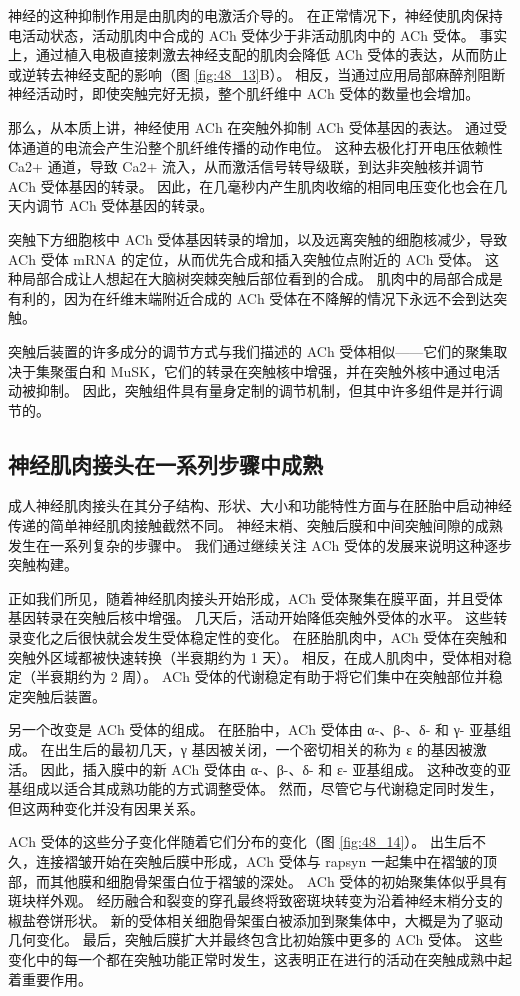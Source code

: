 神经的这种抑制作用是由肌肉的电激活介导的。 在正常情况下，神经使肌肉保持电活动状态，活动肌肉中合成的 ACh 受体少于非活动肌肉中的 ACh 受体。 事实上，通过植入电极直接刺激去神经支配的肌肉会降低 ACh 受体的表达，从而防止或逆转去神经支配的影响（图 \ref{fig:48_13}B）。 相反，当通过应用局部麻醉剂阻断神经活动时，即使突触完好无损，整个肌纤维中 ACh 受体的数量也会增加。

那么，从本质上讲，神经使用 ACh 在突触外抑制 ACh 受体基因的表达。 通过受体通道的电流会产生沿整个肌纤维传播的动作电位。 这种去极化打开电压依赖性 Ca2+ 通道，导致 Ca2+ 流入，从而激活信号转导级联，到达非突触核并调节 ACh 受体基因的转录。 因此，在几毫秒内产生肌肉收缩的相同电压变化也会在几天内调节 ACh 受体基因的转录。

突触下方细胞核中 ACh 受体基因转录的增加，以及远离突触的细胞核减少，导致 ACh 受体 mRNA 的定位，从而优先合成和插入突触位点附近的 ACh 受体。 这种局部合成让人想起在大脑树突棘突触后部位看到的合成。 肌肉中的局部合成是有利的，因为在纤维末端附近合成的 ACh 受体在不降解的情况下永远不会到达突触。

突触后装置的许多成分的调节方式与我们描述的 ACh 受体相似——它们的聚集取决于集聚蛋白和 MuSK，它们的转录在突触核中增强，并在突触外核中通过电活动被抑制。 因此，突触组件具有量身定制的调节机制，但其中许多组件是并行调节的。

\subsection{神经肌肉接头在一系列步骤中成熟}
成人神经肌肉接头在其分子结构、形状、大小和功能特性方面与在胚胎中启动神经传递的简单神经肌肉接触截然不同。 神经末梢、突触后膜和中间突触间隙的成熟发生在一系列复杂的步骤中。 我们通过继续关注 ACh 受体的发展来说明这种逐步突触构建。

正如我们所见，随着神经肌肉接头开始形成，ACh 受体聚集在膜平面，并且受体基因转录在突触后核中增强。 几天后，活动开始降低突触外受体的水平。 这些转录变化之后很快就会发生受体稳定性的变化。 在胚胎肌肉中，ACh 受体在突触和突触外区域都被快速转换（半衰期约为 1 天）。 相反，在成人肌肉中，受体相对稳定（半衰期约为 2 周）。 ACh 受体的代谢稳定有助于将它们集中在突触部位并稳定突触后装置。

另一个改变是 ACh 受体的组成。 在胚胎中，ACh 受体由 α-、β-、δ- 和 γ- 亚基组成。 在出生后的最初几天，γ 基因被关闭，一个密切相关的称为 ε 的基因被激活。 因此，插入膜中的新 ACh 受体由 α-、β-、δ- 和 ε- 亚基组成。 这种改变的亚基组成以适合其成熟功能的方式调整受体。 然而，尽管它与代谢稳定同时发生，但这两种变化并没有因果关系。

ACh 受体的这些分子变化伴随着它们分布的变化（图 \ref{fig:48_14}）。 
出生后不久，连接褶皱开始在突触后膜中形成，ACh 受体与 rapsyn 一起集中在褶皱的顶部，而其他膜和细胞骨架蛋白位于褶皱的深处。 ACh 受体的初始聚集体似乎具有斑块样外观。 经历融合和裂变的穿孔最终将致密斑块转变为沿着神经末梢分支的椒盐卷饼形状。 新的受体相关细胞骨架蛋白被添加到聚集体中，大概是为了驱动几何变化。 最后，突触后膜扩大并最终包含比初始簇中更多的 ACh 受体。 这些变化中的每一个都在突触功能正常时发生，这表明正在进行的活动在突触成熟中起着重要作用。

